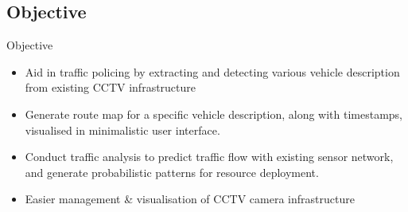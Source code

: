 \documentclass{beamer}
\begin{document}
	\subsection{Objective}
	\begin{frame}{Objective}
		\begin{itemize}
			\item Aid in traffic policing by extracting and detecting various vehicle
			description from existing CCTV infrastructure
			\item Generate route map for a specific vehicle description, along with timestamps, visualised in minimalistic user interface. 
			\item Conduct traffic analysis to predict traffic flow with existing sensor
			network, and generate probabilistic patterns for resource deployment.
			\item Easier management \& visualisation of CCTV camera infrastructure
		\end{itemize}
	\end{frame}
\end{document}
